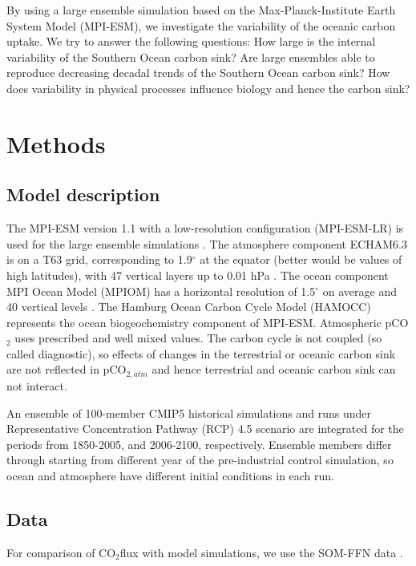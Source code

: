 \documentclass[12pt]{article}
\begin{document}
By using a large ensemble simulation based on the Max-Planck-Institute Earth System Model (MPI-ESM), we investigate the variability of the oceanic carbon uptake. We try to answer the following questions: How large is the internal variability of the Southern Ocean carbon sink? Are large ensembles able to reproduce decreasing decadal trends of the Southern Ocean carbon sink? How does variability in physical processes influence biology and hence the carbon sink?



\section{Methods}

\subsection{Model description}
The MPI-ESM version 1.1 with a low-resolution configuration (MPI-ESM-LR) is used for the large ensemble simulations \citep{Giorgetta2013}. The atmosphere component ECHAM6.3 is on a T63 grid, corresponding to 1.9$^\circ$ at the equator (better would be values of high latitudes), with 47 vertical layers up to 0.01 hPa \citep{Stevens2013}. The ocean component MPI Ocean Model (MPIOM) has a horizontal resolution of 1.5$^\circ$ on average and 40 vertical levels \citep{Jungclaus2013}. The Hamburg Ocean Carbon Cycle Model (HAMOCC) \citep{Ilyina2013} represents the ocean biogeochemistry component of MPI-ESM. 
Atmospheric pCO$_2$ uses prescribed and well mixed values. The carbon cycle is not coupled (so called diagnostic), so effects of changes in the terrestrial or oceanic carbon sink are not reflected in pCO$_{2,atm}$ and hence terrestrial and oceanic carbon sink can not interact.

An ensemble of 100-member CMIP5 historical simulations and runs under  Representative Concentration Pathway (RCP) 4.5 scenario are integrated for the periods from 1850-2005, and 2006-2100, respectively. Ensemble members differ through starting from different year of the pre-industrial control simulation, so ocean and atmosphere have different initial conditions in each run.  

\subsection{Data}
For comparison of CO$_2$flux with model simulations, we use the SOM-FFN data \citep{landschuetzer2015}.
\end{document}

